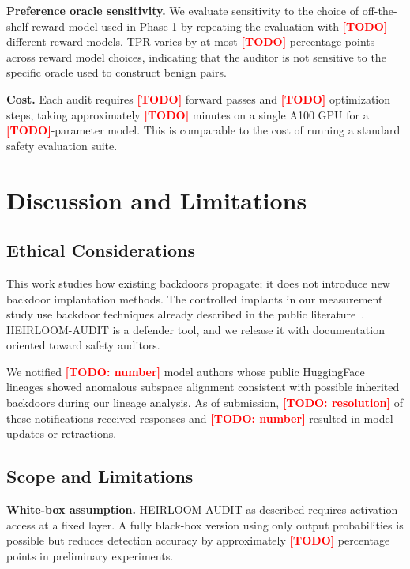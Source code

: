 \documentclass[conference,compsoc]{IEEEtran}
\newcommand{\res}[1]{\textcolor{red}{\textbf{[#1]}}}
\begin{document}
\textbf{Preference oracle sensitivity.} We evaluate sensitivity to the choice of off-the-shelf reward model used in Phase 1 by repeating the evaluation with \res{TODO} different reward models. TPR varies by at most \res{TODO} percentage points across reward model choices, indicating that the auditor is not sensitive to the specific oracle used to construct benign pairs.

\textbf{Cost.} Each audit requires \res{TODO} forward passes and \res{TODO} optimization steps, taking approximately \res{TODO} minutes on a single A100 GPU for a \res{TODO}-parameter model. This is comparable to the cost of running a standard safety evaluation suite.

\section{Discussion and Limitations}
\label{sec:discussion}

\subsection{Ethical Considerations}

This work studies how existing backdoors propagate; it does not introduce new backdoor implantation methods. The controlled implants in our measurement study use backdoor techniques already described in the public literature~\cite{yang2023badchain,rando2024universal}. HEIRLOOM-AUDIT is a defender tool, and we release it with documentation oriented toward safety auditors.

We notified \res{TODO: number} model authors whose public HuggingFace lineages showed anomalous subspace alignment consistent with possible inherited backdoors during our lineage analysis. As of submission, \res{TODO: resolution} of these notifications received responses and \res{TODO: number} resulted in model updates or retractions.

\subsection{Scope and Limitations}

\textbf{White-box assumption.} HEIRLOOM-AUDIT as described requires activation access at a fixed layer. A fully black-box version using only output probabilities is possible but reduces detection accuracy by approximately \res{TODO} percentage points in preliminary experiments.
\end{document}
